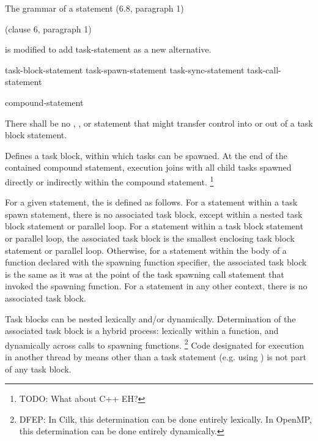
\pnum
The grammar of a statement (6.8, paragraph 1)
\begin{cpp}
(clause 6, paragraph 1)
\end{cpp}
is modified to add task-statement as a new alternative.


\begin{bnf}
\br
task-block-statement
\br
task-spawn-statement
\br
task-sync-statement
\br
task-call-statement
\end{bnf}


\begin{bnf}
\br
{}  compound-statement
\end{bnf}


\pnum
There shall be no
,
,
or
statement that might transfer control into or out of
a task block statement.


\pnum
Defines a task block, within which tasks can be spawned.
At the end of the contained compound statement,
execution joins with
all child tasks spawned directly or indirectly
within the compound statement.
\footnote{TODO:
What about C++ EH?
}

\pnum
For a given statement, the
is defined as follows.
For a statement within a task spawn statement,
there is no associated task block,
except within a nested task block statement
or parallel loop.
For a statement within a task block statement
or parallel loop,
the associated task block is the smallest enclosing task block statement
or parallel loop.
Otherwise, for a statement within the body of a function
declared with the spawning function specifier,
the associated task block is the same as it was
at the point of the task spawning call statement
that invoked the spawning function.
For a statement in any other context,
there is no associated task block.

\begin{note}
Task blocks can be nested lexically and/or dynamically.
Determination of the associated task block is a hybrid process:
lexically within a function,
and dynamically across calls to spawning functions.%
\footnote{DFEP:
In Cilk, this determination can be done entirely lexically.
In OpenMP, this determination can be done entirely dynamically.
}
Code designated for execution in another thread
by means other than a task statement
(e.g. using
)
is not part of any task block.
\end{note}

